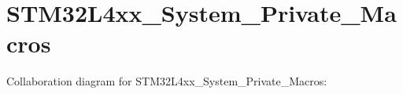 \hypertarget{group__STM32L4xx__System__Private__Macros}{}\section{S\+T\+M32\+L4xx\+\_\+\+System\+\_\+\+Private\+\_\+\+Macros}
\label{group__STM32L4xx__System__Private__Macros}
Collaboration diagram for S\+T\+M32\+L4xx\+\_\+\+System\+\_\+\+Private\+\_\+\+Macros\+:
